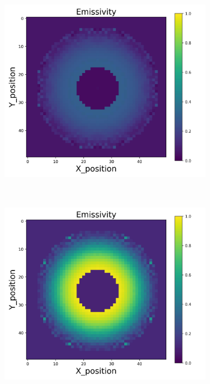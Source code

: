 \begin{figure}[p]
\begin{minipage}{\textwidth}
\begin{subfigure}{0.325\textwidth}
        \end{subfigure}
        \begin{subfigure}{0.325\textwidth}
            \centering
            \includegraphics[width=\textwidth]{figures/raw_data/21/mix/emi_cal.jpg}
        \end{subfigure}
    \end{minipage}\\
    \begin{minipage}{\textwidth}
        \centering
        \begin{subfigure}{0.325\textwidth}
            \centering
            \includegraphics[width=\textwidth]{figures/raw_data/22/mix/emi_cal.jpg}

\end{subfigure}
\end{minipage}
\end{figure}
